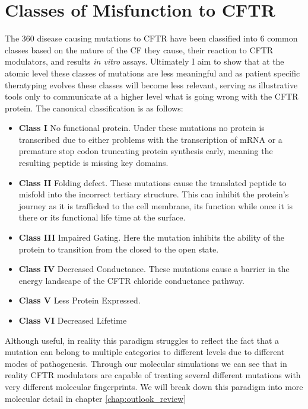 \section{Classes of Misfunction to CFTR}
The 360 disease causing mutations to CFTR have been classified into 6 common classes based on the nature of the CF they cause, their reaction to CFTR modulators, and results \textit{in vitro} assays. Ultimately I aim to show that at the atomic level these classes of mutations are less meaningful and as patient specific theratyping evolves these classes will become less relevant, serving as illustrative tools only to communicate at a higher level what is going wrong with the CFTR protein. The canonical classification is as follows:
\begin{itemize}
	\item \textbf{Class I} No functional protein. Under these mutations no protein is transcribed due to either problems with the transcription of mRNA or a premature stop codon truncating protein synthesis early, meaning the resulting peptide is missing key domains. 
	\item \textbf{Class II} Folding defect. These mutations cause the translated peptide to misfold into the incorrect tertiary structure. This can inhibit the protein's journey as it is trafficked to the cell membrane, its function while once it is there or its functional life time at the surface. 
	\item \textbf{Class III} Impaired Gating. Here the mutation inhibits the ability of the protein to transition from the closed to the open state. 
	\item \textbf{Class IV} Decreased Conductance. These mutations cause a barrier in the energy landscape of the CFTR chloride conductance pathway.
	\item \textbf{Class V} Less Protein Expressed.  
	\item \textbf{Class VI} Decreased Lifetime

\end{itemize}

Although useful, in reality this paradigm struggles to reflect the fact that a mutation can belong to multiple categories to different levels due to different modes of pathogenesis. Through our molecular simulations we can see that in reality CFTR modulators are capable of treating several different mutations with very different molecular fingerprints. We will break down this paradigm into more molecular detail in chapter \ref{chap:outlook_review}

